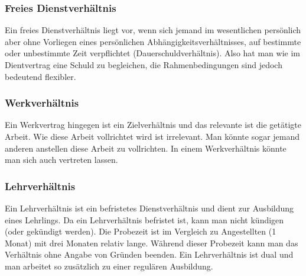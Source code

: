 \documentclass{article}
\begin{document}
	\subsubsection{Freies Dienstverhältnis}
	Ein freies Dienstverhältnis liegt vor, wenn sich jemand im wesentlichen persönlich aber ohne Vorliegen eines persönlichen Abhängigkeitsverhältnisses, auf bestimmte oder unbestimmte Zeit verpflichtet (Dauerschuldverhältnis). Also hat man wie im Dientvertrag eine Schuld zu begleichen, die Rahmenbedingungen sind jedoch bedeutend flexibler.
	\subsubsection{Werkverhältnis}
	Ein Werkvertrag hingegen ist ein Zielverhältnis und das relevante ist die getätigte Arbeit. Wie diese Arbeit vollrichtet wird ist irrelevant. Man könnte sogar jemand anderen anstellen diese Arbeit zu vollrichten. In einem Werkverhältnis könnte man sich auch vertreten lassen.
	\subsubsection{Lehrverhältnis}
	Ein Lehrverhältnis ist ein befristetes Dienstverhältnis und dient zur Ausbildung eines Lehrlings. Da ein Lehrverhältnis befristet ist, kann man nicht kündigen (oder gekündigt werden). Die Probezeit ist im Vergleich zu Angestellten (1 Monat) mit drei Monaten relativ lange. Während dieser Probezeit kann man das Verhältnis ohne Angabe von Gründen beenden. Ein Lehrverhältnis ist dual und man arbeitet so zusätzlich zu einer regulären Ausbildung.



















  
\end{document}

